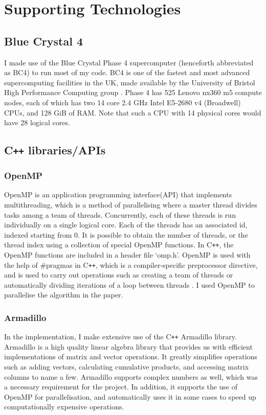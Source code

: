 \documentclass[ %
                    author={Manan Vaswani},
                supervisor={Dr. Raphael Clifford},
                    degree={MEng},
                     title={A multi-core CPU implementation \n of the classical Boson Sampling algorithm},
                  subtitle={},
                      type={},
                      year={2019} ]{dissertation}
\begin{document}
\chapter*{Supporting Technologies}

\section{Blue Crystal 4} \label{bc4}
I made use of the Blue Crystal Phase 4 supercomputer (henceforth abbreviated as BC4) to run most of my code. BC4 is one of the fastest and most advanced supercomputing facilities in the UK, made available by the University of Bristol High Performance Computing group \cite{blue_crystal}. Phase 4 has 525 Lenovo nx360 m5 compute nodes, each of which has two 14 core 2.4 GHz Intel E5-2680 v4 (Broadwell) CPUs, and 128 GiB of RAM. Note that such a CPU with 14 physical cores would have 28 logical cores.

\section{C\texttt{++} libraries/APIs}
\subsection{OpenMP} \label{openMP}
OpenMP is an application programming interface(API) that implements multithreading, which is a method of parallelising where a master thread divides tasks among a team of threads. Concurrently, each of these threads is run individually on a single logical core. Each of the threads has an associated id, indexed starting from 0. It is possible to obtain the number of threads, or the thread index using a collection of special OpenMP functions. In C\texttt{++}, the OpenMP functions are included in a header file `omp.h'. OpenMP is used with the help of \#pragmas in C\texttt{++}, which is a compiler-specific preprocessor directive, and is used to carry out operations such as creating a team of threads or automatically dividing iterations of a loop between threads \cite{dagum1998openmp}. I used OpenMP to parallelise the algorithm in the paper. 

\subsection{Armadillo}
In the implementation, I make extensive use of the C\texttt{++} Armadillo library\cite{armadillo}. Armadillo is a high quality linear algebra library that provides us with efficient implementations of matrix and vector operations. It greatly simplifies operations such as adding vectors, calculating cumulative products, and accessing matrix columns to name a few. Armadillo supports complex numbers as well, which was a necessary requirement for the project. In addition, it supports the use of OpenMP for parallelisation, and automatically uses it in some cases to speed up computationally expensive operations.
\end{document}
